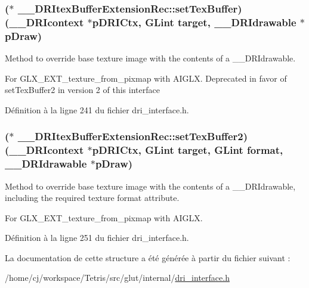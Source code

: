 \hypertarget{struct_____d_r_itex_buffer_extension_rec_ae7c9e2b7cc766c7c7a5f5e95e8143d72}{
\subsubsection[{set\-Tex\-Buffer}]{($\ast$ \-\_\-\-\_\-\-D\-R\-Itex\-Buffer\-Extension\-Rec\-::set\-Tex\-Buffer)({\bf \-\_\-\-\_\-\-D\-R\-Icontext} $\ast$p\-D\-R\-I\-Ctx, {\bf G\-Lint} {\bf target}, {\bf \-\_\-\-\_\-\-D\-R\-Idrawable} $\ast$p\-Draw)}}\label{struct_____d_r_itex_buffer_extension_rec_ae7c9e2b7cc766c7c7a5f5e95e8143d72}
Method to override base texture image with the contents of a \-\_\-\-\_\-\-D\-R\-Idrawable.

For G\-L\-X\-\_\-\-E\-X\-T\-\_\-texture\-\_\-from\-\_\-pixmap with A\-I\-G\-L\-X. Deprecated in favor of set\-Tex\-Buffer2 in version 2 of this interface 

Définition à la ligne 241 du fichier dri\-\_\-interface.\-h.

\hypertarget{struct_____d_r_itex_buffer_extension_rec_abe6cb2446ea81a36b55247d3919cd468}{
\subsubsection[{set\-Tex\-Buffer2}]{($\ast$ \-\_\-\-\_\-\-D\-R\-Itex\-Buffer\-Extension\-Rec\-::set\-Tex\-Buffer2)({\bf \-\_\-\-\_\-\-D\-R\-Icontext} $\ast$p\-D\-R\-I\-Ctx, {\bf G\-Lint} {\bf target}, {\bf G\-Lint} {\bf format}, {\bf \-\_\-\-\_\-\-D\-R\-Idrawable} $\ast$p\-Draw)}}\label{struct_____d_r_itex_buffer_extension_rec_abe6cb2446ea81a36b55247d3919cd468}
Method to override base texture image with the contents of a \-\_\-\-\_\-\-D\-R\-Idrawable, including the required texture format attribute.

For G\-L\-X\-\_\-\-E\-X\-T\-\_\-texture\-\_\-from\-\_\-pixmap with A\-I\-G\-L\-X. 

Définition à la ligne 251 du fichier dri\-\_\-interface.\-h.



La documentation de cette structure a été générée à partir du fichier suivant \-:\begin{DoxyCompactItemize}
\item 
/home/cj/workspace/\-Tetris/src/glut/internal/\hyperlink{dri__interface_8h}{dri\-\_\-interface.\-h}\end{DoxyCompactItemize}
